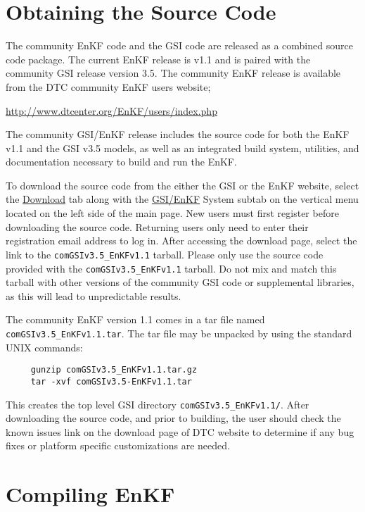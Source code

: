 \section{Obtaining the Source Code} \label{ch2_obtain_code}

The community EnKF code and the GSI code are released as a combined source code package. The current 
EnKF release is v1.1 and is paired with the community GSI release version 3.5.
The community EnKF release is available from the DTC community EnKF users website;

\url{http://www.dtcenter.org/EnKF/users/index.php}

The community GSI/EnKF release includes the source code for both the EnKF v1.1 and the GSI v3.5 models, as 
well as an integrated build system, utilities, and documentation necessary to build and run the EnKF.  

To download the source code from the either the GSI or the EnKF website, select the \underline{Download} tab 
along with the \underline{GSI/EnKF} System subtab on the vertical menu located on the left side of 
the main page. New users must first register before downloading the source code. Returning users only need 
to enter their registration email address to log in. After accessing the download page, select the link to the 
\verb|comGSIv3.5_EnKFv1.1| tarball. Please only use the source code provided with the 
\verb|comGSIv3.5_EnKFv1.1| tarball. Do not mix and match this tarball with other versions of the community 
GSI code or supplemental libraries, as this will lead to unpredictable results.

The community EnKF version 1.1 comes in a tar file named \verb|comGSIv3.5_EnKFv1.1.tar|. The tar file may 
be unpacked by using the standard UNIX commands:
\begin{verbatim}
     gunzip comGSIv3.5_EnKFv1.1.tar.gz 
     tar -xvf comGSIv3.5-EnKFv1.1.tar
\end{verbatim}
This creates the top level GSI directory \verb|comGSIv3.5_EnKFv1.1/|.
After downloading the source code, and prior to building, the user should check the known issues link on the 
download page of DTC website to determine if any bug fixes or platform specific customizations are needed.

\section{Compiling EnKF} \label{ch2_compiling}

